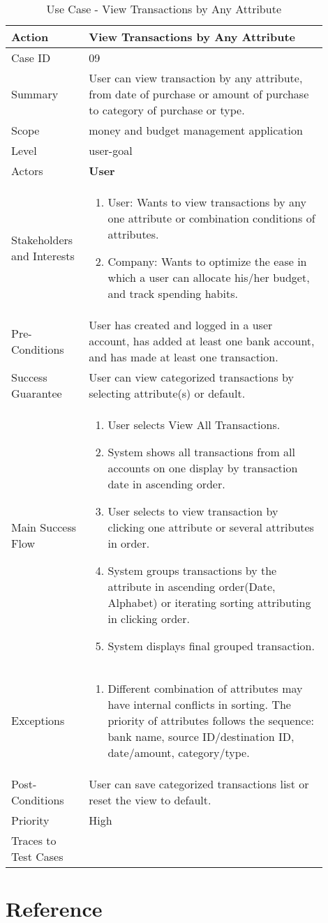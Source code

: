 \documentclass[11pt]{article}
\newcounter{use case ID}
\newcommand\tabularhead[1]{
\begin{table}[ht]
    \addtocounter{use case ID}{1}
    \caption{Use Case \arabic{use case ID} - #1}
    \vspace{0.2cm}
    \begin{tabular}{|p{0.2\linewidth}|p{0.70\linewidth}|}
    \hline
        \textbf{Action} & \textbf{#1} \\
        \hline}
\newcommand\addrow[2]{#1 & #2\\ \hline}
\newcommand\addmulrow[2]{ \begin{minipage}[t][][t]{2.5cm}#1\end{minipage}
        &\begin{minipage}[t][][t]{11cm}
        \begin{enumerate}[itemsep=-1ex] #2   \end{enumerate}
    \end{minipage}\vfill\\ \hline}
\newenvironment{usecase}{\tabularhead}
{\hline\end{tabular}\end{table}}
\begin{document}
\begin{usecase}{View Transactions by Any Attribute}
    \addrow{Case ID}{09}
    \addrow{Summary}{User can view transaction by any attribute, from date of purchase or amount of purchase to category of purchase or type.}
    \addrow{Scope}{money and budget management application}
    \addrow{Level}{user-goal}
    \addrow{Actors}{\textbf{User}}
    \addmulrow{Stakeholders and Interests}{
        \item User: Wants to view transactions by any one attribute or combination conditions of attributes.
        \item Company: Wants to optimize the ease in which a user can allocate his/her budget, and track spending habits.}
    \addrow{Pre-Conditions}{User has created and logged in a user account, has added at least one bank account, and has made at least one transaction.}
    \addrow{Success Guarantee}{User can view categorized transactions by selecting attribute(s) or default.}
    \addmulrow{Main Success Flow}{
        \item User selects View All Transactions.
        \item System shows all transactions from all accounts on one display by transaction date in ascending order.
        \item User selects to view transaction by clicking one attribute or several attributes in order.
        \item System groups transactions by the attribute in ascending order(Date, Alphabet) or iterating sorting attributing in clicking order.
        \item System displays final grouped transaction.}
    \addmulrow{Exceptions}{
    	\item Different combination of attributes may have internal conflicts in sorting. The priority of attributes follows the sequence: bank name, source ID/destination ID, date/amount, category/type.}
    \addrow{Post-Conditions}{User can save categorized transactions list or reset the view to default. }
    \addrow{Priority}{High}
    \addrow{Traces to Test Cases}{}
\end{usecase}

\clearpage 
\section{Reference}
\end{document}
